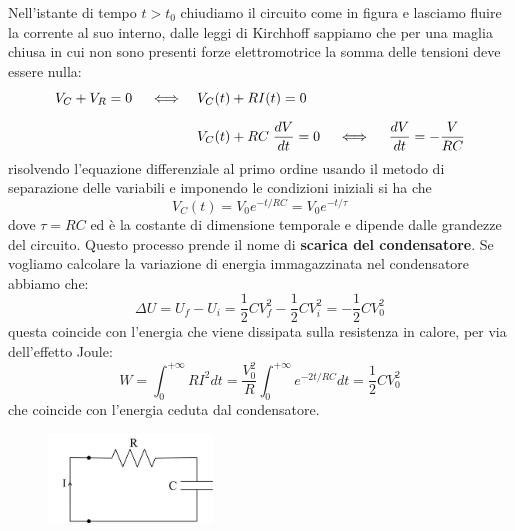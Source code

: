 Nell'istante di tempo $t>t_0$ chiudiamo il circuito come in figura e lasciamo fluire la corrente al suo interno, dalle leggi di Kirchhoff sappiamo che per una maglia chiusa in cui non sono presenti forze elettromotrice la somma delle tensioni deve essere nulla:
\begin{align*}
	V_{C} + V_{R} = 0 \quad \iff \quad & V_{C}(t) + RI(t) = 0 \\ \rule{0pt}{20pt}
	& V_{C}(t) + RC\;\frac{dV}{dt} = 0 \quad \iff \quad \frac{dV}{dt} = - \frac{V}{RC}
\end{align*}
risolvendo l'equazione differenziale al primo ordine usando il metodo di separazione delle variabili e imponendo le condizioni iniziali si ha che 
\begin{equation*}
	V_{C}(t) = V_{0}e^{-t/RC} = V_0 e^{-t/\tau}
\end{equation*}
dove $\tau = RC$ ed \`e la costante di dimensione temporale e dipende dalle grandezze del circuito. Questo processo prende il nome di \textbf{scarica del condensatore}. Se vogliamo calcolare la variazione di energia immagazzinata nel condensatore abbiamo che:
\begin{equation*}
	\Delta U = U_{f} - U_{i} = \frac{1}{2}C V_{f}^2 - \frac{1}{2}CV_{i}^2 = - \frac{1}{2}CV_{0}^2
\end{equation*}
questa coincide con l'energia che viene dissipata sulla resistenza in calore, per via dell'effetto Joule:
\begin{equation*}
	W = \int_{0}^{+\infty} RI^2dt = \frac{V_{0}^2}{R} \int_{0}^{+\infty} e^{-2t/RC}dt = \frac{1}{2}C V_0^2
\end{equation*}
che coincide con l'energia ceduta dal condensatore.

\begin{figure}
\vspace{-1cm}
  \centering
  \includegraphics[width=0.39\textwidth]{images/RC_open}
\end{figure}

